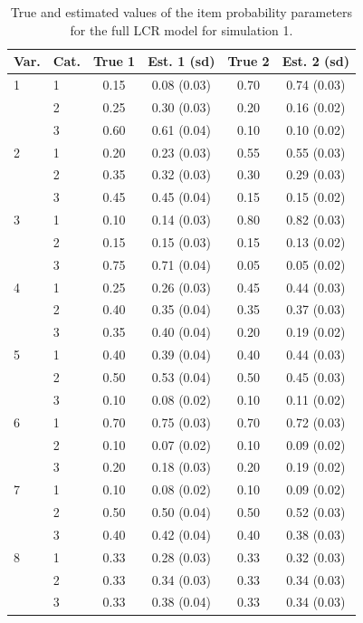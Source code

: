 \documentclass[11pt]{article}
\theoremstyle{plain}
\theoremstyle{definition}
\begin{document}
\begin{table}[H]
  \centering
\begin{tabular}{llcccc}
\toprule
\textbf{Var.} & \textbf{Cat.} & \textbf{True 1} & \textbf{Est. 1 (sd)} & \textbf{True 2} & \textbf{Est. 2 (sd)}  \\
\midrule
1 & 1 & 0.15 & 0.08 (0.03) & 0.70 & 0.74 (0.03)    \\
  & 2 & 0.25 & 0.30 (0.03) & 0.20 & 0.16 (0.02)   \\
  & 3 & 0.60 & 0.61 (0.04) & 0.10 & 0.10 (0.02)   \\
2 & 1 & 0.20 & 0.23 (0.03) & 0.55 & 0.55 (0.03)   \\
  & 2 & 0.35 & 0.32 (0.03) & 0.30 & 0.29 (0.03)   \\
  & 3 & 0.45 & 0.45 (0.04) & 0.15 & 0.15 (0.02)   \\
3 & 1 & 0.10 & 0.14 (0.03) & 0.80 & 0.82 (0.03)    \\
  & 2 & 0.15 & 0.15 (0.03) & 0.15 & 0.13 (0.02)    \\
  & 3 & 0.75 & 0.71 (0.04) & 0.05 & 0.05 (0.02)    \\
4 & 1 & 0.25 & 0.26 (0.03) & 0.45 & 0.44 (0.03)    \\
  & 2 & 0.40 & 0.35 (0.04) & 0.35 & 0.37 (0.03)    \\
  & 3 & 0.35 & 0.40 (0.04) & 0.20 & 0.19 (0.02)    \\
5 & 1 & 0.40 & 0.39 (0.04) & 0.40 & 0.44 (0.03)   \\
  & 2 & 0.50 & 0.53 (0.04) & 0.50 & 0.45 (0.03)   \\
  & 3 & 0.10 & 0.08 (0.02) & 0.10 & 0.11 (0.02)   \\
6 & 1 & 0.70 & 0.75 (0.03) & 0.70 & 0.72 (0.03)    \\
  & 2 & 0.10 & 0.07 (0.02) & 0.10 & 0.09 (0.02)   \\
  & 3 & 0.20 & 0.18 (0.03) & 0.20 & 0.19 (0.02)   \\
7 & 1 & 0.10 & 0.08 (0.02) & 0.10 & 0.09 (0.02)   \\
  & 2 & 0.50 & 0.50 (0.04) & 0.50 & 0.52 (0.03)    \\
  & 3 & 0.40 & 0.42 (0.04) & 0.40 & 0.38 (0.03)    \\  
8 & 1 & 0.33 & 0.28 (0.03) & 0.33 & 0.32 (0.03)  \\
  & 2 & 0.33 & 0.34 (0.03) & 0.33 & 0.34 (0.03)    \\
  & 3 & 0.33 & 0.38 (0.04) & 0.33 & 0.34 (0.03)   \\  
\bottomrule
\end{tabular}
\caption{True and estimated values of the item probability parameters for the full LCR model for simulation 1.}
  \label{table:sim1_item_prob_estimates_full_LCR}
\end{table}
\end{document}
